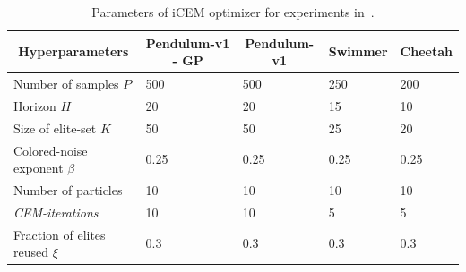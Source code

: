 \begin{table}[htb]
    \caption{Parameters of iCEM optimizer for experiments in~.}
    \label{tab:icem_params}
\begin{tabular}{lllll}
\midrule
\multicolumn{1}{c}{\textbf{Hyperparameters}} & \multicolumn{1}{c}{\textbf{Pendulum-v1 - GP}} & \multicolumn{1}{c}{\textbf{Pendulum-v1}} & \multicolumn{1}{c}{\textbf{Swimmer}} & \multicolumn{1}{c}{\textbf{Cheetah}} \\
\midrule
 Number of samples $P$             & 500                                  & 500                             & 250                         & 200                         \\
         Horizon $H$                             & 20                                   & 20                              & 15                          & 10                          \\
Size of elite-set $K$                & 50                                   & 50                              & 25                          & 20                          \\
Colored-noise exponent $\beta$            & 0.25                                 & 0.25                            & 0.25                         & 0.25                        \\
Number of particles                 & 10                                   & 10                              & 10                          & 10                          \\
\textit{CEM-iterations}                   & 10                                   & 10                              & 5                           & 5                           \\


Fraction of elites reused $\xi$              & 0.3                                  & 0.3                             & 0.3                         & 0.3      \\                  
\bottomrule
\end{tabular}
\end{table}
